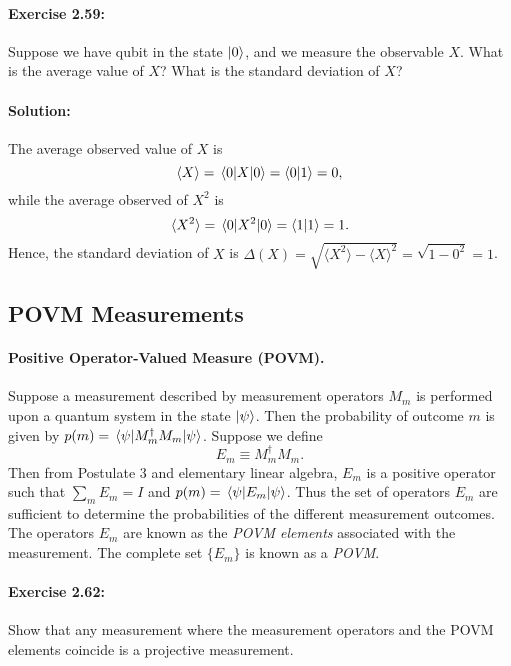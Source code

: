 \paragraph{\cite{mikeandike} Exercise 2.59:} Suppose we have qubit in the state
$\ket{0}$, and we measure the observable $X$. What is the average value of $X$?
What is the standard deviation of $X$?

\paragraph{Solution:} The average observed value of $X$ is \begin{equation*}
  \langle X \rangle = \mel{0}{X}{0} = \braket{0}{1} = 0,
\end{equation*} while the average observed of $X^2$ is \begin{equation*}
  \langle X^2 \rangle = \mel{0}{X^2}{0} = \braket{1}{1} = 1.
\end{equation*} Hence, the standard deviation of $X$ is $\Delta(X) = \sqrt{
\langle X^2 \rangle - \langle X \rangle^2} = \sqrt{1 - 0^2} = 1$.

\subsection{POVM Measurements}

\paragraph{Positive Operator-Valued Measure (POVM).} Suppose a measurement
described by measurement operators $M_m$ is performed upon a quantum system in
the state $\ket{\psi}$. Then the probability of outcome $m$ is given by $p(m) =
\mel{\psi}{M_m^{\dagger}M_m}{\psi}$. Suppose we define \begin{equation*}
  E_m \equiv M_m^{\dagger}M_m.
\end{equation*} Then from Postulate 3 and elementary linear algebra, $E_m$ is a
positive operator such that $\sum_mE_m = I$ and $p(m) = \mel{\psi}{E_m}{\psi}$.
Thus the set of operators $E_m$ are sufficient to determine the probabilities
of the different measurement outcomes. The operators $E_m$ are known as the
\emph{POVM elements} associated with the measurement. The complete set
$\{E_m\}$ is known as a \emph{POVM}.

\paragraph{\cite{mikeandike} Exercise 2.62:} Show that any measurement where
the measurement operators and the POVM elements coincide is a projective
measurement.


